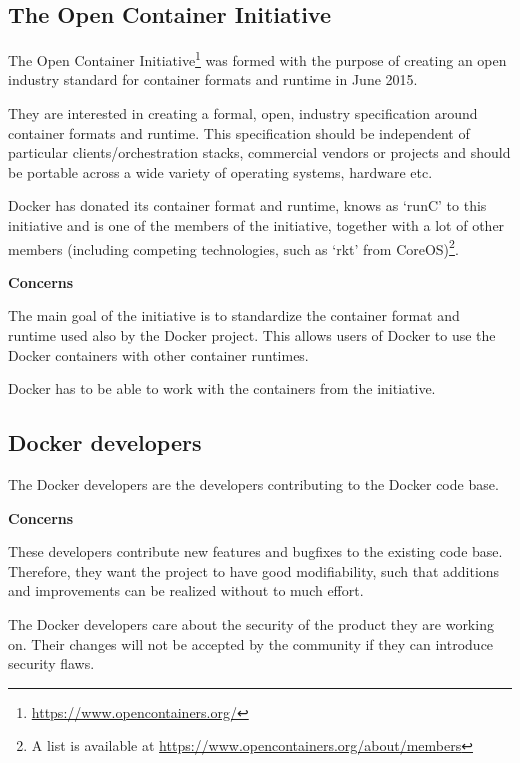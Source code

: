 \subsection*{The Open Container Initiative}

The Open Container Initiative\footnote{\url{https://www.opencontainers.org/}} was formed with the purpose of creating an open industry standard for container formats and runtime in June 2015.

They are interested in creating a formal, open, industry specification around container formats and runtime. This specification should be independent of particular clients/orchestration stacks, commercial vendors or projects and should be portable across a wide variety of operating systems, hardware etc.

Docker has donated its container format and runtime, knows as `runC' to this initiative and is one of the members of the initiative, together with a lot of other members (including competing technologies, such as `rkt' from CoreOS)\footnote{A list is available at \url{https://www.opencontainers.org/about/members}}.

\textbf{Concerns}
\begin{description}[labelindent=25pt,style=multiline,leftmargin=4.0cm,font=\normalfont\itshape]

\item[Portability] The main goal of the initiative is to standardize the container format and runtime used also by the Docker project. This allows users of Docker to use the Docker containers with other container runtimes.

\item[Interoperability] Docker has to be able to work with the containers from the initiative.

\end{description}

\subsection*{Docker developers}
The Docker developers are the developers contributing to the Docker code base.

\textbf{Concerns}
\begin{description}[labelindent=25pt,style=multiline,leftmargin=4.0cm,font=\normalfont\itshape]

\item[Maintainability] These developers contribute new features and bugfixes to the existing code base. Therefore, they want the project to have good modifiability, such that additions and improvements can be realized without to much effort.


\item[Security] The Docker developers care about the security of the product they are working on. Their changes will not be accepted by the community if they can introduce security flaws.  %

\end{description}

